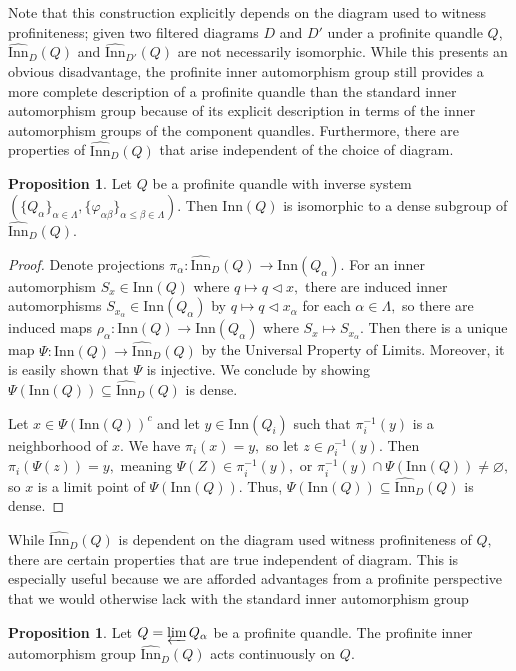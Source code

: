 \documentclass[reqno,dvipsnames]{amsart}
\renewcommand{\a}{\alpha}
\renewcommand{\b}{\beta}
\newcommand{\Inn}{\text{Inn}}
\newcommand{\pInn}{\widehat{\text{Inn}}}
\theoremstyle{definition}
\newtheorem{proposition}[theorem]{Proposition}
\begin{document}
{Note that this construction explicitly depends on the diagram used to witness profiniteness; given two filtered diagrams $D$ and $D'$ under a profinite quandle $Q$, $\pInn_D(Q)$ and $\pInn_{D'}(Q)$ are not necessarily isomorphic. While this presents an obvious disadvantage, the profinite inner automorphism group still provides a more complete description of a profinite quandle than the standard inner automorphism group because of its explicit description in terms of the inner automorphism groups of the component quandles. Furthermore, there are properties of $\pInn_D(Q)$ that arise independent of the choice of diagram.

\begin{proposition}
Let $Q$ be a profinite quandle with inverse system $(\{Q_\a\}_{\a \in \Lambda},\{\varphi_{\a\b}\}_{\a \leq \b \in \Lambda})$. Then $\Inn(Q)$ is isomorphic to a dense subgroup of $\pInn_D(Q).$
\end{proposition}

\begin{proof}
Denote projections $\pi_\a : \pInn_D(Q) \to \Inn(Q_\a).$ For an inner automorphism $S_x \in \Inn(Q)$ where $q \mapsto q \triangleleft x,$ there are induced inner automorphisms $S_{x_\a} \in \Inn(Q_\a)$ by $q \mapsto q \triangleleft x_\a$ for each $\a \in \Lambda,$ so there are induced maps $\rho_\a : \Inn(Q) \to \Inn(Q_\a)$ where $S_x \mapsto S_{x_\a}.$ Then there is a unique map $\Psi: \Inn(Q) \to \pInn_D(Q)$ by the Universal Property of Limits. Moreover, it is easily shown that $\Psi$ is injective. We conclude by showing $\Psi(\Inn(Q)) \subseteq \pInn_D(Q)$ is dense.

Let $x \in \Psi(\Inn(Q))^c$ and let $y \in \Inn(Q_i)$ such that $\pi_i^{-1}(y)$ is a neighborhood of $x.$ We have $\pi_i(x) = y,$ so let $z \in \rho_i^{-1}(y).$ Then $\pi_i(\Psi(z)) = y,$ meaning $\Psi(Z) \in \pi_i^{-1}(y),$ or $\pi_i^{-1}(y) \cap \Psi(\Inn(Q)) \neq \varnothing,$ so $x$ is a limit point of $\Psi(\Inn(Q)).$ Thus, $\Psi(\Inn(Q)) \subseteq \pInn_D(Q)$ is dense.
\end{proof}

While $\pInn_D(Q)$ is dependent on the diagram used witness profiniteness of $Q,$ there are certain properties that are true independent of diagram. This is especially useful because we are afforded advantages from a profinite perspective that we would otherwise lack with the standard inner automorphism group

\begin{proposition}
Let $Q=\varprojlim Q_\a$ be a profinite quandle. The profinite inner automorphism group $\pInn_D(Q)$ acts continuously on $Q$.
\end{proposition}

}
\end{document}
